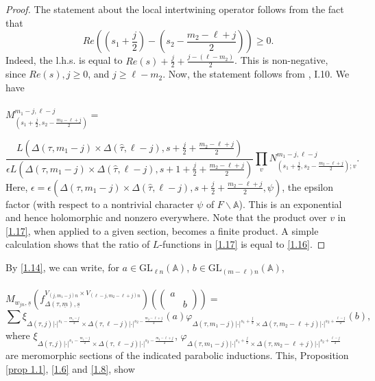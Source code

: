 \documentclass[12pts]{amsart}
\newcommand{\BA}{{\mathbb {A}}}
\newcommand{\GL}{{\mathrm{GL}}}
\begin{document}
\begin{proof}
The statement about the local intertwining operator follows from the fact that $$
Re((s_1+\frac{j}{2})-(s_2-\frac{m_2-\ell+j}{2}))\geq 0.
$$
Indeed, the l.h.s. is equal to $Re(s)+\frac{j}{2}+\frac{j-(\ell-m_2)}{2}$. This is non-negative, since $Re(s),j\geq 0$, and $j\geq \ell-m_2$. Now, the statement follows from \cite{MW89}, I.10. We have\\
\\
$	M^{m_1-j,\ell-j}_{(s_1+\frac{j}{2},s_2-\frac{m_2-\ell+j}{2})}=$

\begin{equation}\label{1.17}
 \frac{L(\Delta(\tau,m_1-j)\times \Delta(\hat{\tau},\ell-j),s+\frac{j}{2}+\frac{m_2-\ell+j}{2})}{\epsilon L(\Delta(\tau,m_1-j)\times \Delta(\hat{\tau},\ell-j),s+1+\frac{j}{2}+\frac{m_2-\ell+j}{2})}\prod_vN^{m_1-j,\ell-j}_{(s_1+\frac{j}{2},s_2-\frac{m_2-\ell+j}{2});v}.
\end{equation}
Here, $\epsilon=\epsilon(\Delta(\tau,m_1-j)\times \Delta(\hat{\tau},\ell-j),s+\frac{j}{2}+\frac{m_2-\ell+j}{2},\psi)$, the epsilon factor (with respect to a nontrivial character $\psi$ of $F\backslash \BA$). This is an exponential and hence holomorphic and nonzero everywhere.
Note that the product over $v$ in \eqref{1.17}, when applied to a given section, becomes a finite product. A simple calculation shows that the ratio of $L$-functions in \eqref{1.17} is equal to \eqref{1.16}.
\end{proof} 	
By \eqref{1.14}, we can write, for $a\in \GL_{\ell n}(\BA)$, $b\in \GL_{(m-\ell)n}(\BA)$,\\
\\
$ M_{w_{jn},\underline{s}}(f^{V_{(j,m_1-j)n}\times V_{(\ell-j,m_2-\ell+j)n}}_{\Delta(\tau,\underline{m}),\underline{s}})(\begin{pmatrix}a\\&b\end{pmatrix})=$
\\
\begin{equation}\label{1.18}
\sum \xi_{\Delta(\tau,j)|\cdot|^{s_1-\frac{m_1-j}{2}}\times \Delta(\tau,\ell-j)|\cdot|^{s_2-\frac{m_2-\ell+j}{2}}}(a)\varphi_{\Delta(\tau,m_1-j)|\cdot|^{s_1+\frac{j}{2}}\times \Delta(\tau,m_2-\ell+j)|\cdot|^{s_2+\frac{\ell-j}{2}}}(b),
\end{equation}
where $\xi_{\Delta(\tau,j)|\cdot|^{s_1-\frac{m_1-j}{2}}\times \Delta(\tau,\ell-j)|\cdot|^{s_2-\frac{m_2-\ell+j}{2}}}$, $\varphi_{\Delta(\tau,m_1-j)|\cdot|^{s_1+\frac{j}{2}}\times \Delta(\tau,m_2-\ell+j)|\cdot|^{s_2+\frac{\ell-j}{2}}}$ are meromorphic sections of the indicated parabolic inductions.	This, Proposition \ref{prop 1.1}, \eqref{1.6} and \eqref{1.8}, show 
\end{document}
